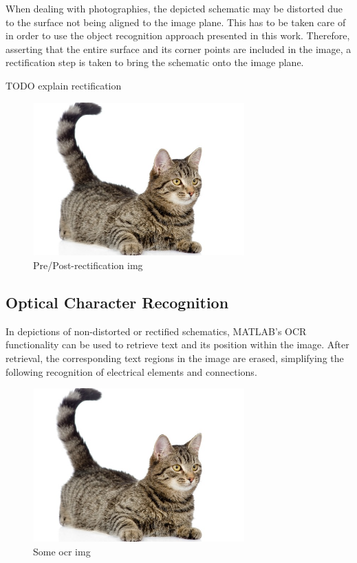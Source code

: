 \documentclass[10pt,twocolumn,letterpaper]{article}
\begin{document}
When dealing with photographies, the depicted schematic may be distorted due to the surface not being aligned to the image plane. This has to be taken care of in order to use the object recognition approach presented in this work. Therefore, asserting that the entire surface and its corner points are included in the image, a rectification step is taken to bring the schematic onto the image plane.
\par

TODO explain rectification
\par

\begin{figure}[!ht]
\includegraphics[width = 3.2in]{img/cat.jpg}
\caption{Pre/Post-rectification img}
\label{fig:c5}
\end{figure}

\subsection{Optical Character Recognition}
\label{subsec:ocr}

In depictions of non-distorted or rectified schematics, MATLAB's OCR functionality can be used to retrieve text and its position within the image. After retrieval, the corresponding text regions in the image are erased, simplifying the following recognition of electrical elements and connections.
\par

\begin{figure}[!ht]
\includegraphics[width = 3.2in]{img/cat.jpg}
\caption{Some ocr img}
\label{fig:c6}
\end{figure}
\par
\end{document}
